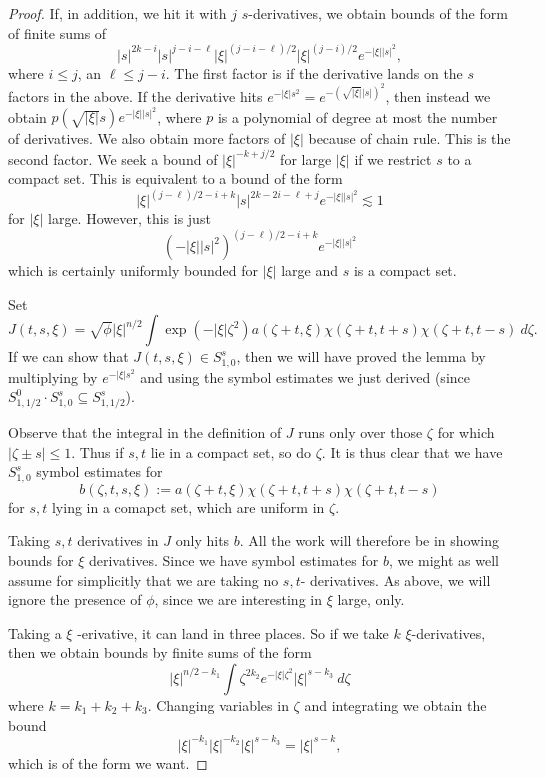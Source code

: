 \documentclass[12pt]{article}
\begin{document}
\begin{proof}
If, in addition, we hit it with $j$ $s$-derivatives, we obtain bounds of the form of finite sums of
\[|s|^{2k-i}|s|^{j-i-\ell}|\xi|^{(j-i-\ell)/2}|\xi|^{(j-i)/2}e^{-|\xi||s|^2},\]
where $i \leq j$, an $\ell \leq j-i$. The first factor is if the derivative lands on the $s$ factors in the above. If the derivative hits $e^{-|\xi|s^2} = e^{-(\sqrt{|\xi|}|s|)^2}$, then instead we obtain $p(\sqrt{|\xi|}s)e^{-|\xi||s|^2}$, where $p$ is a polynomial of degree at most the number of derivatives. We also obtain more factors of $|\xi|$ because of chain rule. This is the second factor.
We seek a bound of $|\xi|^{-k+j/2}$ for large $|\xi|$ if we restrict $s$ to a compact set. This is equivalent to a bound of the form
\[|\xi|^{(j-\ell)/2-i+k}|s|^{2k-2i-\ell+j}e^{-|\xi||s|^2} \lesssim 1\] for $|\xi|$ large. However, this is just
\[(-|\xi||s|^2)^{(j-\ell)/2-i+k}e^{-|\xi||s|^2}\] which is certainly uniformly bounded for $|\xi|$ large and $s$ is a compact set.

Set
\[J(t,s,\xi) = \sqrt{\phi}|\xi|^{n/2}\int \exp(-|\xi|\zeta^2)a(\zeta+t,\xi)\chi(\zeta+t,t+s)\chi(\zeta+t,t-s)\ d\zeta.\]
If we can show that $J(t,s,\xi) \in S^s_{1,0}$, then we will have proved the lemma by multiplying by $e^{-|\xi|s^2}$ and using the symbol estimates we just derived (since $S^0_{1,1/2}\cdot S^s_{1,0} \subseteq S^s_{1,1/2}$).

Observe that the integral in the definition of $J$ runs only over those $\zeta$ for which $|\zeta\pm s| \leq 1$. Thus if $s,t$ lie in a compact set, so do $\zeta$. It is thus clear that we have $S^s_{1,0}$ symbol estimates for 
\[b(\zeta,t,s,\xi) := a(\zeta+t,\xi)\chi(\zeta+t,t+s)\chi(\zeta+t,t-s)\] for $s,t$ lying in a comapct set, which are uniform in $\zeta$.

Taking $s,t$ derivatives in $J$ only hits $b$. All the work will therefore be in showing bounds for $\xi$ derivatives. Since we have symbol estimates for $b$, we might as well assume for simplicitly that we are taking no $s,t$- derivatives. As above, we will ignore the presence of $\phi$, since we are interesting in $\xi$ large, only.

Taking a $\xi$ -erivative, it can land in three places. So if we take $k$ $\xi$-derivatives, then we obtain bounds by finite sums of the form
\[|\xi|^{n/2-k_1}\int \zeta^{2k_2}e^{-|\xi|\zeta^2}|\xi|^{s-k_3} \ d\zeta\]
where $k = k_1+k_2+k_3$.
Changing variables in $\zeta$  and integrating we obtain the bound
\[|\xi|^{-k_1}|\xi|^{-k_2}|\xi|^{s-k_3} = |\xi|^{s-k},\] which is of the form we want.\end{proof}
\end{document}

